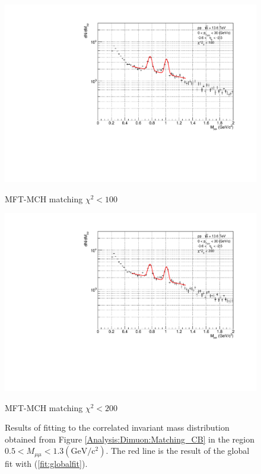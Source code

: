 \begin{figure}[H]
\begin{minipage}{0.45\textwidth}
                \end{minipage}
                \\
                \vspace{1em}
                \begin{minipage}{0.45\textwidth}
                    \centering
                    \includegraphics[width=\textwidth]{fig/3_4_4_Fit_chi2_100.pdf}
                    \caption*{MFT-MCH matching $\chi^2 < 100$}
                \end{minipage}
                \hfill
                \begin{minipage}{0.45\textwidth}
                    \centering
                    \includegraphics[width=\textwidth]{fig/3_4_4_Fit_chi2_200.pdf}
                    \caption*{MFT-MCH matching $\chi^2 < 200$}
                \end{minipage}
                \caption{Results of fitting to the correlated invariant mass distribution obtained from Figure \ref{Analysis:Dimuon:Matching_CB} in the region $0.5 < M_{\mu\mu} < 1.3 (\mathrm{GeV/c^2})$. The red line is the result of the global fit with (\ref{fit:globalfit}).}
                \label{Analysis:Dimuon:Matching_Fit}
            \end{figure}
